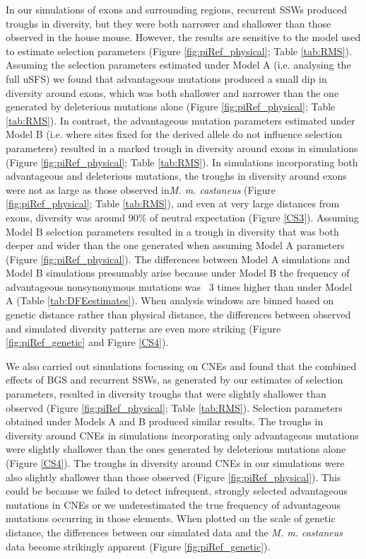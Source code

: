 	In our simulations of exons and surrounding regions, recurrent SSWs produced troughs in diversity, but they were both narrower and shallower than those observed in the house mouse. However, the results are sensitive to the model used to estimate selection parameters (Figure \ref{fig:piRef_physical}; Table \ref{tab:RMS}). Assuming the selection parameters estimated under Model A (i.e. analysing the full uSFS) we found that advantageous mutations produced a small dip in diversity around exons, which was both shallower and narrower than the one generated by deleterious mutations alone (Figure \ref{fig:piRef_physical}; Table \ref{tab:RMS}). In contrast, the advantageous mutation parameters estimated under Model B (i.e. where sites fixed for the derived allele do not influence selection parameters) resulted in a marked trough in diversity around exons in simulations (Figure \ref{fig:piRef_physical}; Table \ref{tab:RMS}). In simulations incorporating both advantageous and deleterious mutations, the troughs in diversity around exons were not as large as those observed in\textit{M. m. castaneus} (Figure \ref{fig:piRef_physical}; Table \ref{tab:RMS}), and even at very large distances from exons, diversity was around 90\% of neutral expectation (Figure \ref{CS3}). Assuming Model B selection parameters resulted in a trough in diversity that was both deeper and wider than the one generated when assuming Model A parameters (Figure \ref{fig:piRef_physical}). The differences between Model A simulations and Model B simulations presumably arise because under Model B the frequency of advantageous nonsynonymous mutations was ~3 times higher than under Model A (Table \ref{tab:DFEestimates}). When analysis windows are binned based on genetic distance rather than physical distance, the differences between observed and simulated diversity patterns are even more striking (Figure \ref{fig:piRef_genetic} and Figure \ref{CS4}). 


	We also carried out simulations focussing on CNEs and found that the combined effects of BGS and recurrent SSWs, as generated by our estimates of selection parameters, resulted in diversity troughs that were slightly shallower than observed (Figure \ref{fig:piRef_physical}; Table \ref{tab:RMS}). Selection parameters obtained under Models A and B produced similar results. The troughs in diversity around CNEs in simulations incorporating only advantageous mutations were slightly shallower than the ones generated by deleterious mutations alone (Figure \ref{CS4}). The troughs in diversity around CNEs in our simulations were also slightly shallower than those observed (Figure \ref{fig:piRef_physical}). This could be because we failed to detect infrequent, strongly selected advantageous mutations in CNEs or we underestimated the true frequency of advantageous mutations occurring in those elements. When plotted on the scale of genetic distance, the differences between our simulated data and the \textit{M. m. castaneus} data become strikingly apparent (Figure \ref{fig:piRef_genetic}). 


